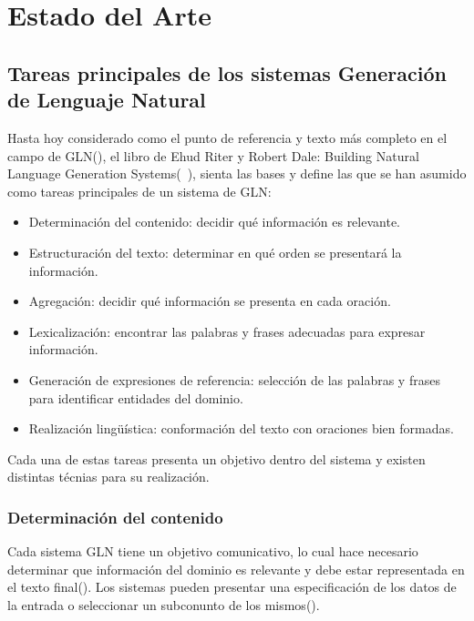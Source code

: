 \chapter{Estado del Arte}\label{chapter:state-of-the-art}


\section{Tareas principales de los sistemas Generación de Lenguaje Natural}

    Hasta hoy considerado como el punto de referencia y texto más completo en el campo de GLN(\cite{Gatt2018SurveyOT}), el libro de Ehud Riter y
Robert Dale: Building Natural Language Generation Systems(~\cite{reiter_dale_2000}), sienta las bases y define las que se han asumido como tareas principales 
de un sistema de GLN:

\begin{itemize}
    \item Determinación del contenido: decidir qué información es relevante.
    \item Estructuración del texto: determinar en qué orden se presentará la información.
    \item Agregación: decidir qué información se presenta en cada oración.
    \item Lexicalización: encontrar las palabras y frases adecuadas para expresar información.
    \item Generación de expresiones de referencia: selección de las palabras y frases para identificar entidades del dominio.
    \item Realización lingüística: conformación del texto con oraciones bien formadas.
\end{itemize}

Cada una de estas tareas presenta un objetivo dentro del sistema y existen distintas técnias para su realización.
    
\subsection{Determinación del contenido}

    Cada sistema GLN tiene un objetivo comunicativo, lo cual hace necesario determinar que información del dominio es relevante y debe 
estar representada en el texto final(\cite{reiter_dale_2000}). Los sistemas pueden presentar una especificación de los datos de la entrada 
o seleccionar un subconunto de los mismos(\cite{reiter_dale_2000}).

